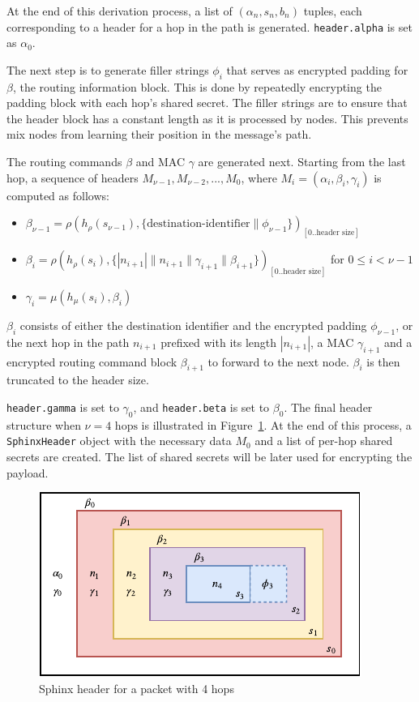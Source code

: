 \documentclass[final,dissertation.tex]{subfiles}
\begin{document}
At the end of this derivation process, a list of $(\alpha_n, s_n, b_n)$ tuples, each corresponding to a header for a hop in the path is generated. \verb|header.alpha| is set as $\alpha_0$.

The next step is to generate filler strings $\phi_i$ that serves as encrypted padding for $\beta$, the routing information block. This is done by repeatedly encrypting the padding block with each hop's shared secret. The filler strings are to ensure that the header block has a constant length as it is processed by nodes. This prevents mix nodes from learning their position in the message's path.

The routing commands $\beta$ and MAC $\gamma$ are generated next. Starting from the last hop, a sequence of headers $M_{\nu-1},M_{\nu-2},...,M_{0}$, where $M_i = (\alpha_i, \beta_i, \gamma_i)$ is computed as follows:

\begin{itemize}
	\setlength\itemsep{-0em}
	\item $\beta_{\nu-1} = \rho(h_\rho(s_{\nu-1}), \{{\text{destination-identifier}}\|\phi_{\nu-1}\})_{[0..\text{header size}]}$
	\item $\beta_{i} = \rho(h_\rho(s_{i}),  \{|n_{i+1}| \| n_{i+1} \| \gamma_{i+1} \| \beta_{i+1}\})_{[0..\text{header size}]}$ for $0 \le i < \nu - 1$
	\item $\gamma_i = \mu(h_\mu(s_{i}), \beta_i)$
\end{itemize}

$\beta_i$ consists of either the destination identifier and the encrypted padding $\phi_{\nu-1}$, or the next hop in the path $n_{i+1}$ prefixed with its length $|n_{i+1}|$, a MAC $\gamma_{i+1}$ and a encrypted routing command block $\beta_{i+1}$ to forward to the next node. $\beta_i$ is then truncated to the header size.

\verb|header.gamma| is set to $\gamma_0$, and \verb|header.beta| is set to $\beta_0$. The final header structure when $\nu = 4\text{ hops}$ is illustrated in Figure~\ref{fig:sphinx_header}. At the end of this process, a \verb|SphinxHeader| object with the necessary data $M_0$ and a list of per-hop shared secrets are created. The list of shared secrets will be later used for encrypting the payload.


\begin{figure}[h]
	\includegraphics[width=\linewidth]{../figs/sphinx_header}
	\caption{Sphinx header for a packet with 4 hops}\label{fig:sphinx_header}
\end{figure}
\end{document}
